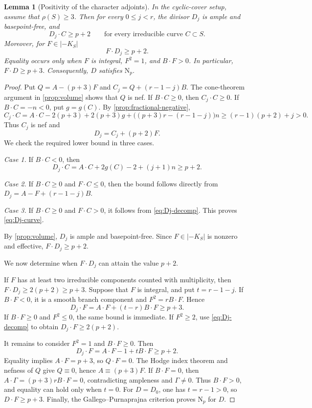 \documentclass[11pt,reqno]{amsart}
\numberwithin{equation}{section}
\newtheorem{lemma}[lemma]{Lemma}
\theoremstyle{remark}
\newcommand{\NP}{\mathrm N}
\begin{document}
\begin{lemma}[Positivity of the character adjoints]
\label{lem:invariant-nonnef}
In the cyclic-cover setup, assume that \(\rho(S)\geq3\).
Then for every $0\le j<r$, the divisor \(D_j\) is ample and basepoint-free, and
\begin{equation}\label{eq:Dj-curve}
 D_j\cdot C\geq p+2
 \qquad\text{for every irreducible curve }C\subset S.
\end{equation}
Moreover, for $F\in|-K_S|$
\[
 F\cdot D_j\geq p+2.
\]
Equality occurs only when \(F\) is integral, $F^2=1$,
and $B\cdot F>0$.
In particular, $F\cdot D\geq p+3$. Consequently, \(D\) satisfies \(\NP_p\).
\end{lemma}

\begin{proof}
Put \(Q=A-(p+3)F\) and \(C_j=Q+(r-1-j)B\).
The cone-theorem argument in \cref{prop:volume} shows that \(Q\) is
nef. If \(B\cdot C\geq0\), then \(C_j\cdot C\geq0\).
If \(B\cdot C=-n<0\), put \(g=g(C)\). By
\cref{prop:fractional-negative},
\[
 C_j\cdot C=A\cdot C-2(p+3)+2(p+3)g+\bigl((p+3)r-(r-1-j)\bigr)n
 \geq(r-1)(p+2)+j>0.
\]
Thus \(C_j\) is nef and
\begin{equation}\label{eq:Dj-decomp}
 D_j=C_j+(p+2)F.
\end{equation}
We check the required lower bound in three cases.

\smallskip\noindent
\emph{Case 1.} If $B\cdot C<0$, then
\[
 D_j\cdot C=A\cdot C+2g(C)-2+(j+1)n\geq p+2.
\]

\smallskip\noindent
\emph{Case 2.} If \(B\cdot C\geq0\) and \(F\cdot C\leq0\), then the bound follows
directly from \(D_j=A-F+(r-1-j)B\).

\smallskip\noindent
\emph{Case 3.} If \(B\cdot C\geq0\) and \(F\cdot C>0\), it follows
from \eqref{eq:Dj-decomp}. This proves \eqref{eq:Dj-curve}.

By \cref{prop:volume}, $D_j$ is ample and
basepoint-free. Since $F\in |-K_S|$ is nonzero and effective, $F\cdot D_j\ge p+2$.

We now determine when $F\cdot D_j$ can attain the value $p+2$.

If \(F\) has at least two irreducible components counted with
multiplicity, then
\(F\cdot D_j\geq2(p+2)\geq p+3\). Suppose that \(F\) is integral,
and put \(t=r-1-j\). If \(B\cdot F<0\), it is a smooth branch
component and \(F^2=rB\cdot F\). Hence
\[
 D_j\cdot F=A\cdot F+(t-r)B\cdot F\geq p+3.
\]
If \(B\cdot F\geq0\) and \(F^2\leq0\), the same bound is immediate.
If \(F^2\geq2\), use \eqref{eq:Dj-decomp} to obtain
\(D_j\cdot F\geq2(p+2)\).

It remains to consider \(F^2=1\) and \(B\cdot F\geq0\). Then
\[
 D_j\cdot F=A\cdot F-1+tB\cdot F\geq p+2.
\]
Equality implies \(A\cdot F=p+3\), so \(Q\cdot F=0\).
The Hodge index theorem and nefness of \(Q\) give \(Q\equiv0\),
hence \(A\equiv (p+3)F\). If \(B\cdot F=0\), then
\(A\cdot\Gamma=(p+3)rB\cdot F=0\), contradicting ampleness and
\(\Gamma\neq0\). Thus \(B\cdot F>0\), and equality can hold only
when \(t=0\). For \(D=D_0\), one has \(t=r-1>0\), so
\(D\cdot F\geq p+3\). Finally, the Gallego--Purnaprajna criterion
\cite[Theorem 1.3]{GP01} proves \(\NP_p\) for \(D\).
\end{proof}
\end{document}
